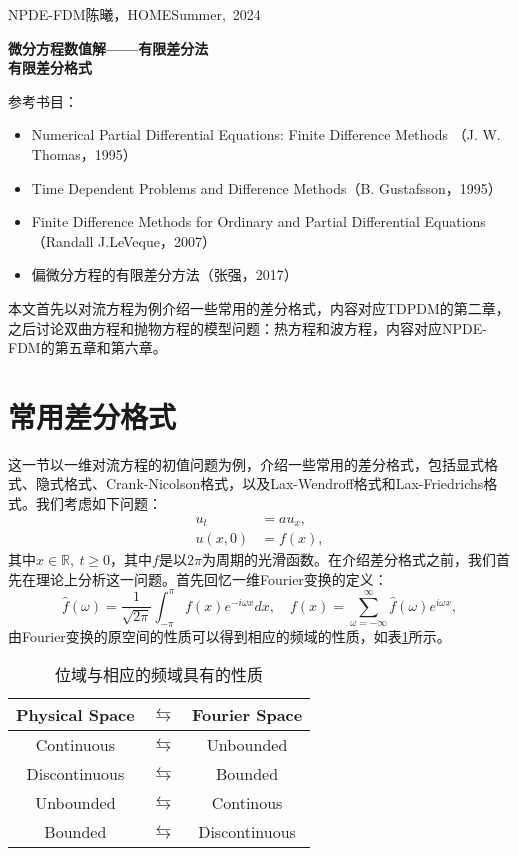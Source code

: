 \documentclass[a4paper,10pt]{ctexart}
\begin{document}
\hfill\vbox{\hbox{NPDE-FDM}\hbox{陈曦，HOME}\hbox{Summer, 2024}}

\begin{center}\Large
    \textbf{微分方程数值解——有限差分法}\\{\normalsize\bf {有限差分格式}}
\end{center}
\vskip 30pt
\small {参考书目：
\begin{itemize}
    \item Numerical Partial Differential Equations: Finite Difference Methods （J. W. Thomas，1995）
    \item Time Dependent Problems and Difference Methods（B. Gustafsson，1995）
    \item Finite Difference Methods for Ordinary and Partial Differential Equations（Randall J.LeVeque，2007）
    \item 偏微分方程的有限差分方法（张强，2017）
\end{itemize}}
\vskip 30pt

本文首先以对流方程为例介绍一些常用的差分格式，内容对应TDPDM的第二章，之后讨论双曲方程和抛物方程的模型问题：热方程和波方程，内容对应NPDE-FDM的第五章和第六章。

\section{常用差分格式}
这一节以一维对流方程的初值问题为例，介绍一些常用的差分格式，包括显式格式、隐式格式、Crank-Nicolson格式，以及Lax-Wendroff格式和Lax-Friedrichs格式。我们考虑如下问题：
\[
    \begin{aligned}
        u_t &= au_x,\\
        u(x,0) &= f(x),
    \end{aligned}
\]
其中$ x\in \mathbb{R},\ t\geqslant 0 $，其中$ f $是以$ 2\pi $为周期的光滑函数。在介绍差分格式之前，我们首先在理论上分析这一问题。首先回忆一维Fourier变换的定义：
\begin{equation}
    \hat{f}(\omega) = \frac{1}{\sqrt{2\pi}}\int_{-\pi}^{\pi} f(x)e^{-i\omega x}d x,\quad f(x) = \sum_{\omega=-\infty}^{\infty} \hat{f}(\omega)e^{i \omega x},
\end{equation}
由Fourier变换的原空间的性质可以得到相应的频域的性质，如表\ref{tab:Fourier}所示。
\begin{table}[h]
    \centering
    \begin{tabular}{ccc}
        \toprule
        Physical Space & $ \leftrightarrows  $ & Fourier Space \\
        \midrule
        Continuous & $ \leftrightarrows  $ & Unbounded \\
        Discontinuous & $ \leftrightarrows  $ & Bounded \\
        Unbounded & $ \leftrightarrows  $ & Continous \\
        Bounded & $ \leftrightarrows  $ & Discontinuous \\
        \bottomrule
    \end{tabular}
    \caption{位域与相应的频域具有的性质}
    \label{tab:Fourier}
\end{table}
\end{document}
